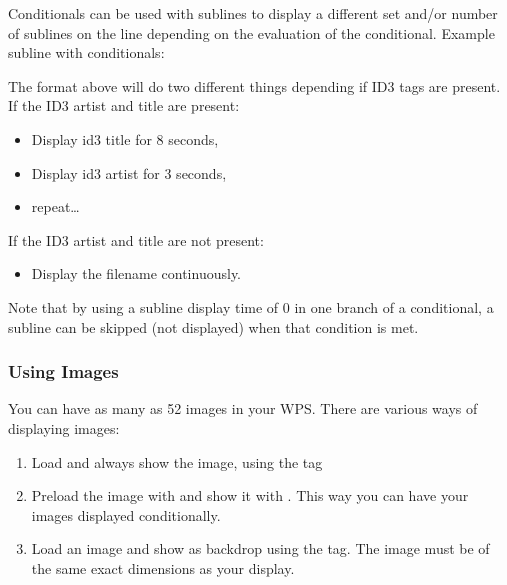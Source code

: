 Conditionals can be used with sublines to display a different set and/or number
of sublines on the line depending on the evaluation of the conditional.
Example subline with conditionals:
\begin{example}
\end{example}

The format above will do two different things depending if ID3 tags are
present. If the ID3 artist and title are present:
\begin{itemize}
\item Display id3 title for 8 seconds,
\item Display id3 artist for 3 seconds,
\item repeat\dots
\end{itemize}
If the ID3 artist and title are not present:
\begin{itemize}
\item Display the filename continuously.
\end{itemize}
Note that by using a subline display time of 0 in one branch of a conditional,
a subline can be skipped (not displayed) when that condition is met.

\subsubsection{Using Images}
You can have as many as 52 images in your WPS. There are various ways of
displaying images:
\begin{enumerate}
  \item Load and always show the image, using the  tag
  \item Preload the image with  and show it with .
    This way you can have your images displayed conditionally.
  \item Load an image and show as backdrop using the  tag. The
    image must be of the same exact dimensions as your display.
\end{enumerate}

%

